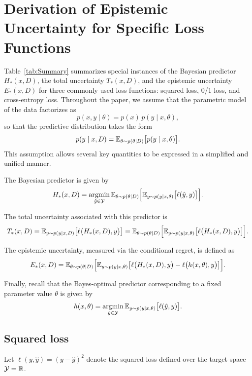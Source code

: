 \section{Derivation of Epistemic Uncertainty for Specific Loss Functions}


Table~\ref{tab:Summary} summarizes special instances of the Bayesian predictor \(H_*(x,D)\), the total uncertainty \(T_*(x,D)\), and the epistemic uncertainty \(E_*(x,D)\) for three commonly used loss functions: squared loss, 0/1 loss, and cross-entropy loss. Throughout the paper, we assume that the parametric model of the data factorizes as
\[
p(x,y \mid \theta) = p(x)\,p(y \mid x,\theta),
\]
so that the predictive distribution takes the form
\[
p(y \mid x,D)
=
{\mathbb{E}}_{\theta \sim p(\theta \mid D)}
\bigl[
p(y \mid x,\theta)
\bigr].
\]
This assumption allows several key quantities to be expressed in a simplified and unified manner.


The Bayesian predictor is given by
\[
H_*(x,D)
=
\mathop{\rm argmin}_{\hat y \in {\cal Y}}
{\mathbb{E}}_{\theta \sim p(\theta \mid D)}
\Big[
{\mathbb{E}}_{y \sim p(y \mid x,\theta)}
\bigl[
\ell(\hat y,y)
\bigr]
\Big].
\]

The total uncertainty associated with this predictor is
\[
T_*(x,D)
=
{\mathbb{E}}_{y \sim p(y \mid x,D)}
\bigl[
\ell\bigl(H_*(x,D),y\bigr)
\bigr]
=
{\mathbb{E}}_{\theta \sim p(\theta \mid D)}
\Big[
{\mathbb{E}}_{y \sim p(y \mid x,\theta)}
\bigl[
\ell\bigl(H_*(x,D),y\bigr)
\bigr]
\Big].
\]

The epistemic uncertainty, measured via the conditional regret, is defined as
\[
E_*(x,D)
=
{\mathbb{E}}_{\theta \sim p(\theta \mid D)}
\Big[
{\mathbb{E}}_{y \sim p(y \mid x,\theta)}
\bigl[
\ell\bigl(H_*(x,D),y\bigr)
-
\ell\bigl(h(x,\theta),y\bigr)
\bigr]
\Big].
\]

Finally, recall that the Bayes-optimal predictor corresponding to a fixed parameter value \(\theta\) is given by
\[
h(x,\theta)
=
\mathop{\rm argmin}_{\hat y \in {\cal Y}}
{\mathbb{E}}_{y \sim p(y \mid x,\theta)}
\bigl[
\ell(\hat y,y)
\bigr].
\]

\subsection{Squared loss}

Let $\ell(y,\hat{y})=(y-\hat{y})^2$ denote the  squared loss defined over the target space ${\cal Y}=\mathbb{R}$. 


